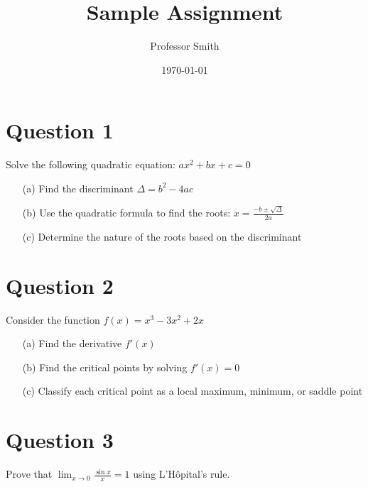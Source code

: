 \documentclass{article}
\title{Sample Assignment}
\author{Professor Smith}
\date{\today}
\begin{document}
\maketitle

\section{Question 1}
Solve the following quadratic equation: $ax^2 + bx + c = 0$

\begin{enumerate}
    \item[(a)] Find the discriminant $\Delta = b^2 - 4ac$
    \item[(b)] Use the quadratic formula to find the roots: $x = \frac{-b \pm \sqrt{\Delta}}{2a}$
    \item[(c)] Determine the nature of the roots based on the discriminant
\end{enumerate}

\section{Question 2}
Consider the function $f(x) = x^3 - 3x^2 + 2x$

\begin{enumerate}
    \item[(a)] Find the derivative $f'(x)$
    \item[(b)] Find the critical points by solving $f'(x) = 0$
    \item[(c)] Classify each critical point as a local maximum, minimum, or saddle point
\end{enumerate}

\section{Question 3}
Prove that $\lim_{x \to 0} \frac{\sin x}{x} = 1$ using L'Hôpital's rule.
\end{document}
